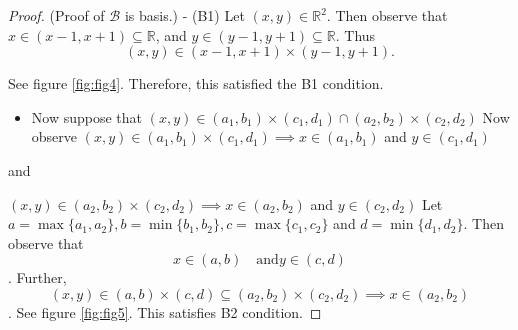 \documentclass[
]{book}
\providecommand{\tightlist}{%
  \setlength{\itemsep}{0pt}\setlength{\parskip}{0pt}}
\theoremstyle{definition}
\theoremstyle{definition}
\theoremstyle{definition}
\theoremstyle{definition}
\theoremstyle{remark}
\begin{document}
\begin{proof}
(Proof of \(\mathcal{B}\) is basis.)
- (B1) Let \((x,y)\in \mathbb{R}^2\). Then observe that \(x\in(x-1,x+1)\subseteq \mathbb{R}\), and \(y\in(y-1,y+1)\subseteq \mathbb{R}\). Thus
\[(x,y)\in (x-1,x+1)\times (y-1,y+1).\]

See figure \ref{fig:fig4}.
Therefore, this satisfied the B1 condition.

\begin{itemize}
\tightlist
\item
  Now suppose that \((x,y)\in (a_1,b_1)\times(c_1,d_1)\cap (a_2,b_2)\times(c_2,d_2)\)
  Now observe
  \((x,y)\in (a_1,b_1)\times(c_1,d_1)\implies x\in(a_1,b_1)\) and \(y\in(c_1,d_1)\)
\end{itemize}

and

\((x,y)\in (a_2,b_2)\times(c_2,d_2)\implies x\in(a_2,b_2)\) and \(y\in(c_2,d_2)\)
Let \(a=\max\{a_1,a_2\},b=\min\{b_1,b_2\}, c=\max\{c_1,c_2\}\) and \(d=\min\{d_1,d_2\}\). Then observe that
\[x\in (a,b)\quad \text{and} y\in (c,d)\].
Further, \[(x,y)\in (a,b)\times (c,d)\subseteq (a_2,b_2)\times(c_2,d_2)\implies x\in(a_2,b_2)\].
See figure \ref{fig:fig5}.
This satisfies B2 condition.
\end{proof}
\end{document}
